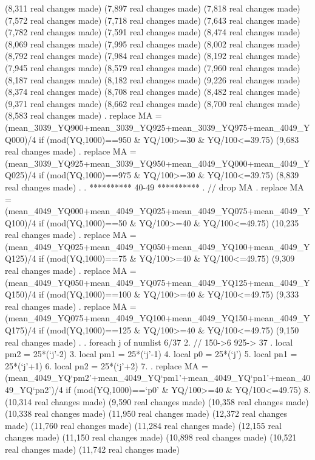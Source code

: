 (8,311 real changes made)
(7,897 real changes made)
(7,818 real changes made)
(7,572 real changes made)
(7,718 real changes made)
(7,643 real changes made)
(7,782 real changes made)
(7,591 real changes made)
(8,474 real changes made)
(8,069 real changes made)
(7,995 real changes made)
(8,002 real changes made)
(8,792 real changes made)
(7,984 real changes made)
(8,192 real changes made)
(7,945 real changes made)
(8,579 real changes made)
(7,960 real changes made)
(8,187 real changes made)
(8,182 real changes made)
(9,226 real changes made)
(8,374 real changes made)
(8,708 real changes made)
(8,482 real changes made)
(9,371 real changes made)
(8,662 real changes made)
(8,700 real changes made)
(8,583 real changes made)
{\smallskip}
. replace MA = (mean_3039_YQ900+mean_3039_YQ925+mean_3039_YQ975+mean_4049_YQ000)/4 if (mod(YQ,1000)==950 \& YQ/100>=30 \& YQ/100<=39.75)
(9,683 real changes made)
{\smallskip}
. replace MA = (mean_3039_YQ925+mean_3039_YQ950+mean_4049_YQ000+mean_4049_YQ025)/4 if (mod(YQ,1000)==975 \& YQ/100>=30 \& YQ/100<=39.75)
(8,839 real changes made)
{\smallskip}
. 
. **********  40-49 **********
. // drop MA
. replace MA = (mean_4049_YQ000+mean_4049_YQ025+mean_4049_YQ075+mean_4049_YQ100)/4 if (mod(YQ,1000)==50 \& YQ/100>=40 \& YQ/100<=49.75)
(10,235 real changes made)
{\smallskip}
. replace MA = (mean_4049_YQ025+mean_4049_YQ050+mean_4049_YQ100+mean_4049_YQ125)/4 if (mod(YQ,1000)==75 \& YQ/100>=40 \& YQ/100<=49.75)
(9,309 real changes made)
{\smallskip}
. replace MA = (mean_4049_YQ050+mean_4049_YQ075+mean_4049_YQ125+mean_4049_YQ150)/4 if (mod(YQ,1000)==100 \& YQ/100>=40 \& YQ/100<=49.75)
(9,333 real changes made)
{\smallskip}
. replace MA = (mean_4049_YQ075+mean_4049_YQ100+mean_4049_YQ150+mean_4049_YQ175)/4 if (mod(YQ,1000)==125 \& YQ/100>=40 \& YQ/100<=49.75)
(9,150 real changes made)
{\smallskip}
. 
. foreach j of numlist 6/37{\lbr}
  2.         // 150->6 925-> 37
.         local pm2 = 25*(`j'-2)
  3.         local pm1 = 25*(`j'-1)
  4.         local p0 = 25*(`j')
  5.         local pn1 = 25*(`j'+1)
  6.         local pn2 = 25*(`j'+2)
  7. 
.         replace MA = (mean_4049_YQ`pm2'+mean_4049_YQ`pm1'+mean_4049_YQ`pn1'+mean_4049_YQ`pn2')/4 if (mod(YQ,1000)==`p0' \& YQ/100>=40 \& YQ/100<=49.75)
  8. {\rbr}
(10,314 real changes made)
(9,590 real changes made)
(10,358 real changes made)
(10,338 real changes made)
(11,950 real changes made)
(12,372 real changes made)
(11,760 real changes made)
(11,284 real changes made)
(12,155 real changes made)
(11,150 real changes made)
(10,898 real changes made)
(10,521 real changes made)
(11,742 real changes made)
